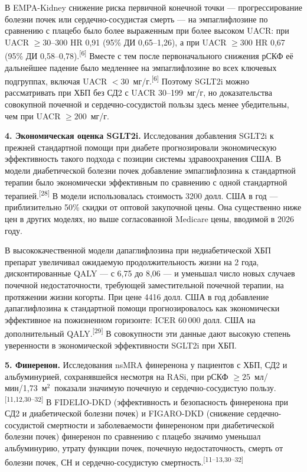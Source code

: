 \documentclass[11pt,a4paper]{article}
\newcommand{\src}[1]{\textsuperscript{[#1]}}
\newcommand{\unitgfr}{мл/мин/1,73~м$^2$}
\begin{document}
В EMPA-Kidney снижение риска первичной конечной точки --- прогрессирование болезни почек или сердечно-сосудистая смерть --- на эмпаглифлозине по сравнению с плацебо было более выраженным при более высоком UACR: при UACR $\geq30$--300 HR 0,91 (95\% ДИ 0,65--1,26), а при UACR $\geq300$ HR 0,67 (95\% ДИ 0,58--0,78).\src{6} Вместе с тем после первоначального снижения рСКФ её дальнейшее падение было медленнее на эмпаглифлозине во всех ключевых подгруппах, включая UACR $<30$~мг/г.\src{6} Поэтому SGLT2i можно рассматривать при ХБП без СД2 с UACR 30--199~мг/г, но доказательства совокупной почечной и сердечно-сосудистой пользы здесь менее убедительны, чем при UACR $\geq200$~мг/г.

\textbf{4. Экономическая оценка SGLT2i.} Исследования добавления SGLT2i к прежней стандартной помощи при диабете прогнозировали экономическую эффективность такого подхода с позиции системы здравоохранения США. В модели диабетической болезни почек добавление эмпаглифлозина к стандартной терапии было экономически эффективным по сравнению с одной стандартной терапией.\src{28} В модели использовалась стоимость 3200 долл. США в год --- приблизительно 50\% скидки от оптовой закупочной цены. Она существенно ниже цен в других моделях, но выше согласованной Medicare цены, вводимой в 2026 году.

В высококачественной модели дапаглифлозина при недиабетической ХБП препарат увеличивал ожидаемую продолжительность жизни на 2 года, дисконтированные QALY --- с 6,75 до 8,06 --- и уменьшал число новых случаев почечной недостаточности, требующей заместительной почечной терапии, на протяжении жизни когорты. При цене 4416 долл. США в год добавление дапаглифлозина к стандартной помощи прогнозировалось как экономически эффективное на пожизненном горизонте: ICER 60\,000 долл. США на дополнительный QALY.\src{29} В совокупности эти данные дают высокую степень уверенности в экономической эффективности SGLT2i при ХБП.

\textbf{5. Финеренон.} Исследования nsMRA финеренона у пациентов с ХБП, СД2 и альбуминурией, сохранявшейся несмотря на RASi, при рСКФ $\geq25$~\unitgfr\ показали значимую почечную и сердечно-сосудистую пользу.\src{11,12,30--32} В FIDELIO-DKD (эффективность и безопасность финеренона при СД2 и диабетической болезни почек) и FIGARO-DKD (снижение сердечно-сосудистой смертности и заболеваемости финереноном при диабетической болезни почек) финеренон по сравнению с плацебо значимо уменьшал альбуминурию, утрату функции почек, почечную недостаточность, смерть от болезни почек, СН и сердечно-сосудистую смертность.\src{11--13,30--32}
\end{document}
